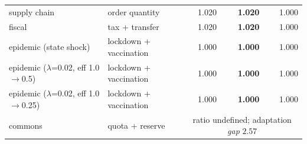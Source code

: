 \begin{table}[t]
\begin{tabular}{@{}l l r r r@{}}
supply chain & order quantity & 1.020 & \textbf{1.020} & 1.000 \\
fiscal & tax + transfer & 1.020 & \textbf{1.020} & 1.000 \\
epidemic (state shock) & lockdown + vaccination & 1.000 & \textbf{1.000} & 1.000 \\
epidemic ($\lambda$=0.02, eff 1.0$\to$0.5) & lockdown + vaccination & 1.000 & \textbf{1.000} & 1.000 \\
epidemic ($\lambda$=0.02, eff 1.0$\to$0.25) & lockdown + vaccination & 1.000 & \textbf{1.000} & 1.000 \\
commons & quota + reserve & \multicolumn{3}{c}{ratio undefined; adaptation \emph{gap} $2.57$} \\
\bottomrule
\end{tabular}
\end{table}
